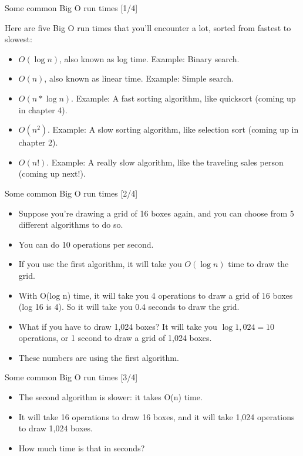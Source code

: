 \documentclass[ignorenonframetext,]{beamer}
\providecommand{\tightlist}{%
  \setlength{\itemsep}{0pt}\setlength{\parskip}{0pt}}
\begin{document}
\begin{frame}{Some common Big O run times {[}1/4{]}}
\protect\hypertarget{some-common-big-o-run-times-14}{}

Here are five Big O run times that you'll encounter a lot, sorted from
fastest to slowest:

\begin{itemize}
\tightlist
\item
  \(O(\log n)\), also known as log time. Example: Binary search.
\item
  \(O(n)\), also known as linear time. Example: Simple search.
\item
  \(O(n * \log n)\). Example: A fast sorting algorithm, like quicksort
  (coming up in chapter 4).
\item
  \(O(n^2 )\). Example: A slow sorting algorithm, like selection sort
  (coming up in chapter 2).
\item
  \(O(n!)\). Example: A really slow algorithm, like the traveling sales
  person (coming up next!).
\end{itemize}

\end{frame}

\begin{frame}{Some common Big O run times {[}2/4{]}}
\protect\hypertarget{some-common-big-o-run-times-24}{}

\begin{itemize}
\tightlist
\item
  Suppose you're drawing a grid of 16 boxes again, and you can choose
  from 5 different algorithms to do so.
\item
  You can do 10 operations per second.
\item
  If you use the first algorithm, it will take you \(O(\log n)\) time to
  draw the grid.\\
\item
  With O(log n) time, it will take you 4 operations to draw a grid of 16
  boxes (log 16 is 4). So it will take you 0.4 seconds to draw the grid.
\item
  What if you have to draw 1,024 boxes? It will take you
  \(\log 1,024 = 10\) operations, or 1 second to draw a grid of 1,024
  boxes.
\item
  These numbers are using the first algorithm.
\end{itemize}

\end{frame}

\begin{frame}{Some common Big O run times {[}3/4{]}}
\protect\hypertarget{some-common-big-o-run-times-34}{}

\begin{itemize}
\tightlist
\item
  The second algorithm is slower: it takes O(n) time.
\item
  It will take 16 operations to draw 16 boxes, and it will take 1,024
  operations to draw 1,024 boxes.
\item
  How much time is that in seconds?
\end{itemize}

\end{frame}
\end{document}

